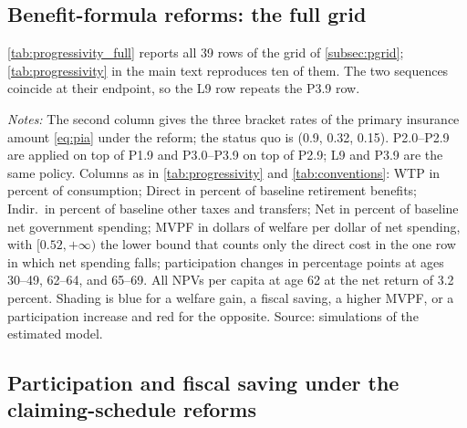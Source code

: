 \subsection{Benefit-formula reforms: the full grid}\label{app:pfull}

\autoref{tab:progressivity_full} reports all 39 rows of the grid of \autoref{subsec:pgrid}; \autoref{tab:progressivity} in the main text reproduces ten of them. %
The two sequences coincide at their endpoint, so the L9 row repeats the P3.9 row. %

\begin{table}[!p]
\centering
\caption{Social Security Progressivity and Level Reforms: Full Grid}
\label{tab:progressivity_full}
\vspace{6pt}
\footnotesize
\setlength{\tabcolsep}{5pt}
\begin{threeparttable}
\cleargradientmacros

\begin{tablenotes}[flushleft]\scriptsize
\item[] \textit{Notes:} The second column gives the three bracket rates of the primary insurance amount \eqref{eq:pia} under the reform; the status quo is (0.9, 0.32, 0.15). P2.0--P2.9 are applied on top of P1.9 and P3.0--P3.9 on top of P2.9; L9 and P3.9 are the same policy. Columns as in \autoref{tab:progressivity} and \autoref{tab:conventions}: WTP in percent of consumption; Direct in percent of baseline retirement benefits; Indir.\ in percent of baseline other taxes and transfers; Net in percent of baseline net government spending; MVPF in dollars of welfare per dollar of net spending, with $[0.52,+\infty)$ the lower bound that counts only the direct cost in the one row in which net spending falls; participation changes in percentage points at ages 30--49, 62--64, and 65--69. All NPVs per capita at age 62 at the net return of 3.2 percent. Shading is blue for a welfare gain, a fiscal saving, a higher MVPF, or a participation increase and red for the opposite. Source: simulations of the estimated model.
\end{tablenotes}
\end{threeparttable}
\end{table}

\subsection{Participation and fiscal saving under the claiming-schedule reforms}\label{app:partsave}

